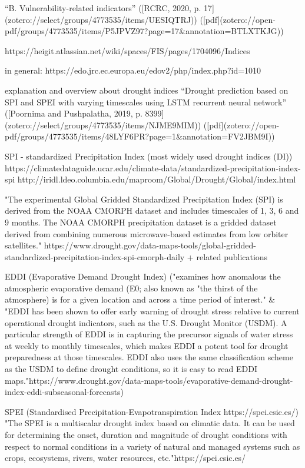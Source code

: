 {“B. Vulnerability-related indicators” ([RCRC, 2020, p. 17](zotero://select/groups/4773535/items/UESIQTRJ)) ([pdf](zotero://open-pdf/groups/4773535/items/P5JPVZ97?page=17&annotation=BTLXTKJG))

https://heigit.atlassian.net/wiki/spaces/FIS/pages/1704096/Indices

in general: https://edo.jrc.ec.europa.eu/edov2/php/index.php?id=1010

explanation and overview about drought indices “Drought prediction based on SPI and SPEI with varying timescales using LSTM recurrent neural network” ([Poornima and Pushpalatha, 2019, p. 8399](zotero://select/groups/4773535/items/NJME9MIM)) ([pdf](zotero://open-pdf/groups/4773535/items/48LYF6PR?page=1&annotation=FV2JBM9I))

SPI - standardized Precipitation Index (most widely used drought indices (DI)) 
https://climatedataguide.ucar.edu/climate-data/standardized-precipitation-index-spi
http://iridl.ldeo.columbia.edu/maproom/Global/Drought/Global/index.html

"The experimental Global Gridded Standardized Precipitation Index (SPI) is derived from the NOAA CMORPH dataset and includes timescales of 1, 3, 6 and 9 months.  The NOAA CMORPH precipitation dataset is a gridded dataset derived from combining numerous microwave-based estimates from low orbiter satellites." https://www.drought.gov/data-maps-tools/global-gridded-standardized-precipitation-index-spi-cmorph-daily + related publications

EDDI (Evaporative Demand Drought Index) ("examines how anomalous the atmospheric evaporative demand (E0; also known as "the thirst of the atmosphere) is for a given location and across a time period of interest." \& "EDDI has been shown to offer early warning of drought stress relative to current operational drought indicators, such as the U.S. Drought Monitor (USDM). A particular strength of EDDI is in capturing the precursor signals of water stress at weekly to monthly timescales, which makes EDDI a potent tool for drought preparedness at those timescales. EDDI also uses the same classification scheme as the USDM to define drought conditions, so it is easy to read EDDI maps."https://www.drought.gov/data-maps-tools/evaporative-demand-drought-index-eddi-subseasonal-forecasts)

SPEI (Standardised Precipitation-Evapotranspiration Index https://spei.csic.es/)
"The SPEI is a multiscalar drought index based on climatic data. It can be used for determining the onset, duration and magnitude of drought conditions with respect to normal conditions in a variety of natural and managed systems such as crops, ecosystems, rivers, water resources, etc."https://spei.csic.es/

}

